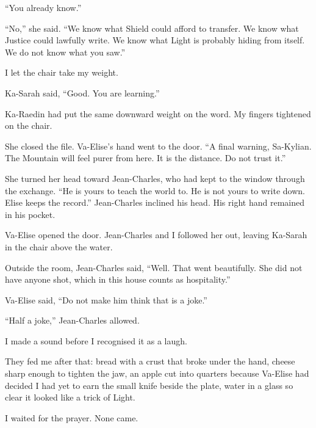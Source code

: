 ``You already know.''\par

``No,'' she said. ``We know what Shield could afford to transfer. We know what Justice could lawfully write. We know what Light is probably hiding from itself. We do not know what you saw.''\par

I let the chair take my weight.\par

Ka-Sarah said, ``Good. You are learning.''\par

Ka-Raedin had put the same downward weight on the word. My fingers tightened on the chair.\par

She closed the file. Va-Elise's hand went to the door. ``A final warning, Sa-Kylian. The Mountain will feel purer from here. It is the distance. Do not trust it.''\par

She turned her head toward Jean-Charles, who had kept to the window through the exchange. ``He is yours to teach the world to. He is not yours to write down. Elise keeps the record.'' Jean-Charles inclined his head. His right hand remained in his pocket.\par

Va-Elise opened the door. Jean-Charles and I followed her out, leaving Ka-Sarah in the chair above the water.\par

Outside the room, Jean-Charles said, ``Well. That went beautifully. She did not have anyone shot, which in this house counts as hospitality.''\par

Va-Elise said, ``Do not make him think that is a joke.''\par

``Half a joke,'' Jean-Charles allowed.\par

I made a sound before I recognised it as a laugh.\par

They fed me after that: bread with a crust that broke under the hand, cheese sharp enough to tighten the jaw, an apple cut into quarters because Va-Elise had decided I had yet to earn the small knife beside the plate, water in a glass so clear it looked like a trick of Light.\par

I waited for the prayer. None came.\par

